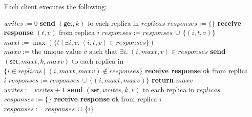 {    %
    \noindent Each client executes the following:
    \begin{algorithmic}
            \State $\mathit{writes} := 0$
        \EndOn
        \State
            \State \textbf{send} $(\mathsf{get}, k)$ to each replica in $\mathit{replicas}$
            \State $\mathit{responses} := \{\}$
                \State \textbf{receive response} $(t,v)$ from replica $i$
                \State $\mathit{responses} := \mathit{responses} \,\cup\, \{(i,t,v)\}$
            \EndWhile
            \State $\mathit{maxt} := \max(\{t \mid \exists i,v.\; (i,t,v) \in \mathit{responses}\})$
            \State $\mathit{maxv} := \text{the unique value } v \text{ such that } \exists i.\; (i,\mathit{maxt},v) \in \mathit{responses}$
            \State \textbf{send} $(\mathsf{set}, \mathit{maxt}, k, \mathit{maxv})$ to each replica in $\{i \in \mathit{replicas} \mid (i, \mathit{maxt}, \mathit{maxv}) \notin \mathit{responses}\}$
                \State \textbf{receive response} $\mathsf{ok}$ from replica $i$
                \State $\mathit{responses} := \mathit{responses} \,\cup\, \{(i, \mathit{maxt}, \mathit{maxv})\}$
            \EndWhile
            \State \textbf{return} $\mathit{maxv}$
        \EndOn
        \State
         
            \State $\mathit{writes} := \mathit{writes} + 1$
            \State \textbf{send} $(\mathsf{set}, \mathit{writes}, k, v)$ to each replica in $\mathit{replicas}$
            \State $\mathit{responses} := \{\}$
                \State \textbf{receive response} $\mathsf{ok}$ from replica $i$
                \State $\mathit{responses} := \mathit{responses} \,\cup\, \{i\}$
            \EndWhile
        \EndOn
    \end{algorithmic}
}

